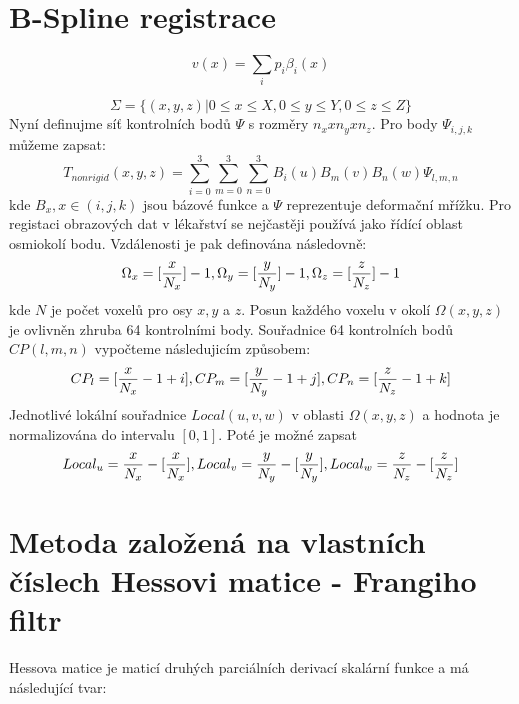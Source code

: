 \documentclass{thesis}%
\begin{document}
%
\section{B-Spline registrace}

\begin{equation}
v(x)=\sum_i p_i \beta_i(x)
\end{equation}

\begin{equation}
\Sigma = \{(x,y,z)|0 \leq x \leq X, 0 \leq y \leq Y, 0 \leq z \leq Z \}
\end{equation}
Nyní definujme síť kontrolních bodů $\Psi$ s rozměry $n_x x n_y x n_z$. Pro body $\Psi_{i,j,k}$ můžeme zapsat:
\begin{equation}
T_{nonrigid}(x,y,z)= \sum_{i=0}^3\sum_{m=0}^3\sum_{n=0}^3 B_i(u)B_m(v)B_n(w) \Psi_{l, m, n} 
\end{equation}
kde $B_x, x\in(i,j,k)$ jsou bázové funkce a $\Psi$ reprezentuje deformační mřížku. Pro registaci obrazových dat v lékařství se nejčastěji používá jako řídící oblast osmiokolí bodu. Vzdálenosti je pak definována následovně:
\begin{equation}
\Omega_x = [\frac{x}{N_x}]-1,\\
\Omega_y = [\frac{y}{N_y}]-1,\\
\Omega_z = [\frac{z}{N_z}]-1
\end{equation}
kde $N$ je počet voxelů pro osy $x,y$ a $z$. Posun každého voxelu v okolí $\Omega(x,y,z)$ je ovlivněn zhruba 64 kontrolními body. Souřadnice 64 kontrolních bodů $CP(l,m,n)$ vypočteme následujicím způsobem:
\begin{equation}
CP_l = [\frac{x}{N_x}-1+i],\\
CP_m = [\frac{y}{N_y}-1+j],\\
CP_n = [\frac{z}{N_z}-1+k]
\end{equation}
Jednotlivé lokální souřadnice $Local(u,v,w)$ v oblasti $\Omega(x,y,z)$ a hodnota je normalizována do intervalu $[0,1]$. Poté je možné zapsat
\begin{equation}
Local_u =\frac{x}{N_x}-[\frac{x}{N_x}],\\
Local_v =\frac{y}{N_y}-[\frac{y}{N_y}],\\
Local_w =\frac{z}{N_z}-[\frac{z}{N_z}]
\end{equation}
\section{Metoda založená na vlastních číslech Hessovi matice - Frangiho filtr}
Hessova matice je maticí druhých parciálních derivací skalární funkce a má následující tvar:
\end{document}
